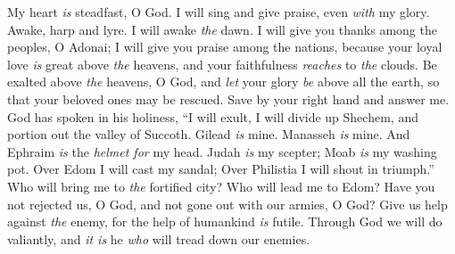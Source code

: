 \begin{biblechapter} %
 My heart \textit{is} steadfast, O God. 
I will sing and give praise, even \textit{with} my glory.
\verse Awake, harp and lyre. 
I will awake \textit{the} dawn.
\verse I will give you thanks among the peoples, O Adonai; 
I will give you praise among the nations,
\verse because your loyal love \textit{is} great above \textit{the} heavens, 
and your faithfulness \textit{reaches} to \textit{the} clouds.
\verse Be exalted above \textit{the} heavens, O God, 
and \textit{let} your glory \textit{be} above all the earth,
\verse so that your beloved ones may be rescued. 
Save by your right hand and answer me.
\verse God has spoken in his holiness, 
“I will exult, I will divide up Shechem, 
and portion out the valley of Succoth.
\verse Gilead \textit{is} mine. Manasseh \textit{is} mine. 
And Ephraim \textit{is} the \textit{helmet for} my head. 
Judah \textit{is} my scepter;
\verse Moab \textit{is} my washing pot. 
Over Edom I will cast my sandal; 
Over Philistia I will shout in triumph.”
\verse Who will bring me to \textit{the} fortified city? 
Who will lead me to Edom?
\verse Have you not rejected us, O God, 
and not gone out with our armies, O God?
\verse Give us help against \textit{the} enemy, 
for the help of humankind \textit{is} futile.
\verse Through God we will do valiantly, 
and \textit{it is} he \textit{who} will tread down our enemies.
\end{biblechapter}

